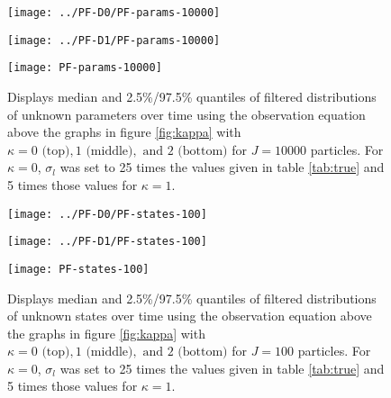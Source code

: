 \documentclass{article}
\begin{document}
\begin{figure}[ht]
\begin{minipage}{1.1\linewidth}
\texttt{[image: ../PF-D0/PF-params-10000]}
\end{minipage}
\begin{minipage}{1.1\linewidth}
\texttt{[image: ../PF-D1/PF-params-10000]}
\end{minipage}
\begin{minipage}{1.1\linewidth}
\texttt{[image: PF-params-10000]}
\end{minipage}
\caption{Displays median and 2.5\%/97.5\% quantiles of filtered distributions of unknown parameters over time using the observation equation above the graphs in figure \ref{fig:kappa} with $\kappa = 0 \mbox{ (top)}, 1 \mbox{ (middle)}, \mbox{ and } 2 \mbox{ (bottom)}$ for $J = 10000$ particles. For $\kappa = 0$, $\sigma_l$ was set to 25 times the values given in table \ref{tab:true} and 5 times those values for $\kappa = 1$.}
\end{figure}

\begin{figure}[ht]
\begin{minipage}{1.0\linewidth}
\texttt{[image: ../PF-D0/PF-states-100]}
\end{minipage}
\begin{minipage}{1.0\linewidth}
\texttt{[image: ../PF-D1/PF-states-100]}
\end{minipage}
\begin{minipage}{1.0\linewidth}
\texttt{[image: PF-states-100]}
\end{minipage}
\caption{Displays median and 2.5\%/97.5\% quantiles of filtered distributions of unknown states over time using the observation equation above the graphs in figure \ref{fig:kappa} with $\kappa = 0 \mbox{ (top)}, 1 \mbox{ (middle)}, \mbox{ and } 2 \mbox{ (bottom)}$ for $J = 100$ particles. For $\kappa = 0$, $\sigma_l$ was set to 25 times the values given in table \ref{tab:true} and 5 times those values for $\kappa = 1$.}
\end{figure}
\end{document}
